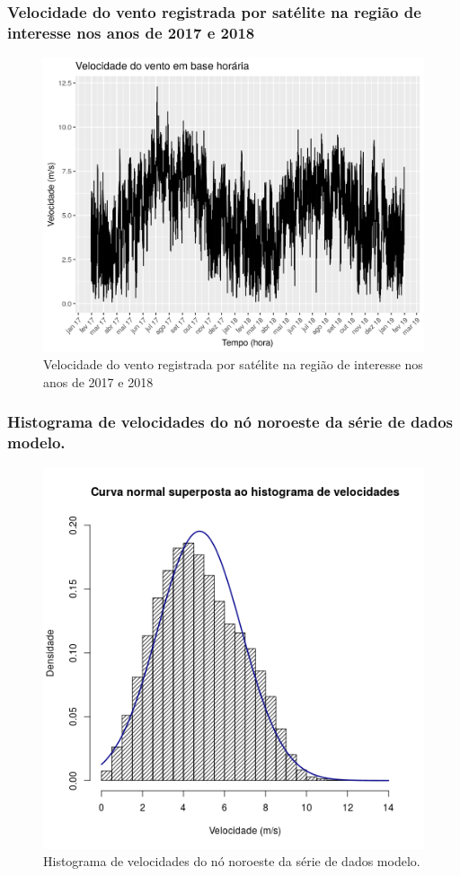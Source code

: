 \documentclass{beamer}
\begin{document}
\begin{frame}
	\frametitle{Velocidade do vento registrada por satélite na região de interesse nos anos de 2017 e 2018}
	\begin{figure}
		\centering
		\includegraphics[width=\textwidth]{entire_series_hourly_basis.png}
		\caption{Velocidade do vento registrada por satélite na região de interesse nos anos de 2017 e 2018}
	\end{figure}
\end{frame}

\begin{frame}
	\frametitle{Histograma de velocidades do nó noroeste da série de dados modelo.}
	\begin{figure}
		\centering
		\includegraphics[width=\textwidth]{normal_overlay}
		\caption{Histograma de velocidades do nó noroeste da série de dados modelo.}
	\end{figure}
\end{frame}
\end{document}
